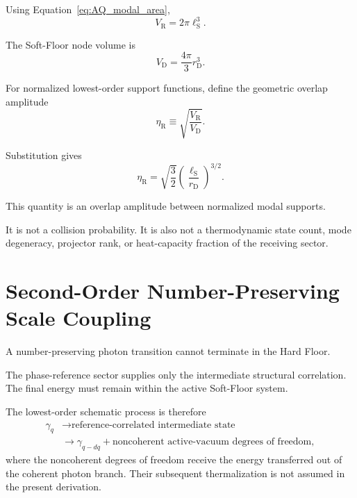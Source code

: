 Using Equation~\eqref{eq:AQ_modal_area},
\begin{equation}
    \boxed{
    V_{\mathrm R}
    =
    2\pi\ell_{\mathrm S}^{3}.
    }
    \label{eq:AQ_VR_explicit}
\end{equation}

The Soft-Floor node volume is
\begin{equation}
    \boxed{
    V_{\mathrm D}
    =
    \frac{4\pi}{3}
    r_{\mathrm D}^{3}.
    }
    \label{eq:AQ_VD}
\end{equation}

For normalized lowest-order support functions, define the geometric overlap
amplitude
\begin{equation}
    \eta_{\mathrm R}
    \equiv
    \sqrt{
        \frac{V_{\mathrm R}}{V_{\mathrm D}}
    }.
    \label{eq:AQ_eta_def}
\end{equation}

Substitution gives
\begin{equation}
    \boxed{
    \eta_{\mathrm R}
    =
    \sqrt{\frac{3}{2}}
    \left(
        \frac{\ell_{\mathrm S}}{r_{\mathrm D}}
    \right)^{3/2}.
    }
    \label{eq:AQ_eta}
\end{equation}

This quantity is an overlap amplitude between normalized modal supports.

It is not a collision probability. It is also not a thermodynamic state count,
mode degeneracy, projector rank, or heat-capacity fraction of the receiving
sector.


\section{Second-Order Number-Preserving Scale Coupling}

A number-preserving photon transition cannot terminate in the Hard Floor.

The phase-reference sector supplies only the intermediate structural
correlation. The final energy must remain within the active Soft-Floor system.

The lowest-order schematic process is therefore
\begin{equation}
    \begin{aligned}
        \gamma_q
        &\longrightarrow
        \text{reference-correlated intermediate state}\\
        &\longrightarrow
        \gamma_{q-dq}
        +\text{noncoherent active-vacuum degrees of freedom},
    \end{aligned}
    \label{eq:AQ_second_order_process}
\end{equation}
where the noncoherent degrees of freedom receive the energy transferred out of
the coherent photon branch. Their subsequent thermalization is not assumed in
the present derivation.

